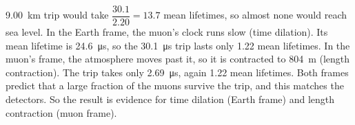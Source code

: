 \begin{practiceanswers}
\begin{practiceans}
\begin{modelanswer}
  \qty{9.00}{km} trip would take $\dfrac{30.1}{2.20} = 13.7$ mean lifetimes, so almost none
  would reach sea level. In the Earth frame, the muon's clock runs slow (time dilation). Its mean
  lifetime is \qty{24.6}{\micro\second}, so the \qty{30.1}{\micro\second} trip lasts only 1.22
  mean lifetimes. In the muon's frame, the atmosphere moves past it, so it is contracted to
  \qty{804}{m} (length contraction). The trip takes only \qty{2.69}{\micro\second}, again 1.22
  mean lifetimes. Both frames predict that a large fraction of the muons survive the trip, and
  this matches the detectors. So the result is evidence for time dilation (Earth frame) and
  length contraction (muon frame).
  \end{modelanswer}
  \begin{markingcriteria}
  \end{markingcriteria}
\end{practiceans}


\end{practiceanswers}
